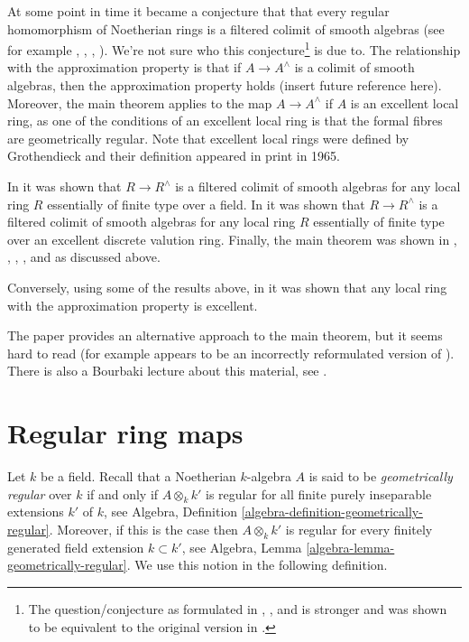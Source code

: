 \medskip\noindent
At some point in time it became a conjecture that
that every regular homomorphism of Noetherian rings is a
filtered colimit of smooth algebras (see for example
\cite{Raynaud-Rennes}, \cite{popescu-global}, \cite{Artin-power-series},
\cite{Artin-Denef}). We're not sure who this conjecture\footnote{The
question/conjecture as formulated in \cite{Artin-power-series},
\cite{Artin-Denef}, and \cite{popescu-global} is stronger and was shown
to be equivalent to the original version in \cite{Cipu}.}
is due to. The relationship with the approximation property is that if
$A \to A^\wedge$ is a colimit of smooth algebras, then the approximation
property holds (insert future reference here). Moreover, the main theorem
applies to the map $A \to A^\wedge$ if $A$ is an excellent local ring, as one
of the conditions of an excellent local ring is that the formal
fibres are geometrically regular. Note that excellent local rings
were defined by Grothendieck and their definition appeared in
print in 1965.

\medskip\noindent
In \cite{Artin-power-series} it was shown that
$R \to R^\wedge$ is a filtered colimit of smooth algebras for any
local ring $R$ essentially of finite type over a field.
In \cite{Rotthaus-Artin} it was shown that $R \to R^\wedge$
is a filtered colimit of smooth algebras for any local ring $R$
essentially of finite type over an excellent discrete valution ring.
Finally, the main theorem was shown in
\cite{popescu-GND}, \cite{popescu-GNDA}, \cite{popescu-letter}, 
\cite{Ogoma}, and \cite{swan} as discussed above.

\medskip\noindent
Conversely, using some of the results above, in \cite{Rotthaus-excellent}
it was shown that any local ring with the approximation property is excellent.

\medskip\noindent
The paper \cite{Spivakovsky} provides an alternative approach to the
main theorem, but it seems hard to read (for example
\cite[Lemma 5.2]{Spivakovsky} appears to be an incorrectly reformulated
version of \cite[Lemma 3]{Elkik}). There is also a Bourbaki
lecture about this material, see \cite{Teissier}.





\section{Regular ring maps}
\label{section-regular}

\noindent
Let $k$ be a field. Recall that a Noetherian $k$-algebra $A$ is
said to be {\it geometrically regular} over $k$ if and only if
$A \otimes_k k'$ is regular for all finite purely inseparable
extensions $k'$ of $k$, see
Algebra, Definition \ref{algebra-definition-geometrically-regular}.
Moreover, if this is the case then $A \otimes_k k'$ is regular
for every finitely generated field extension $k \subset k'$, see
Algebra, Lemma \ref{algebra-lemma-geometrically-regular}.
We use this notion in the following definition.

